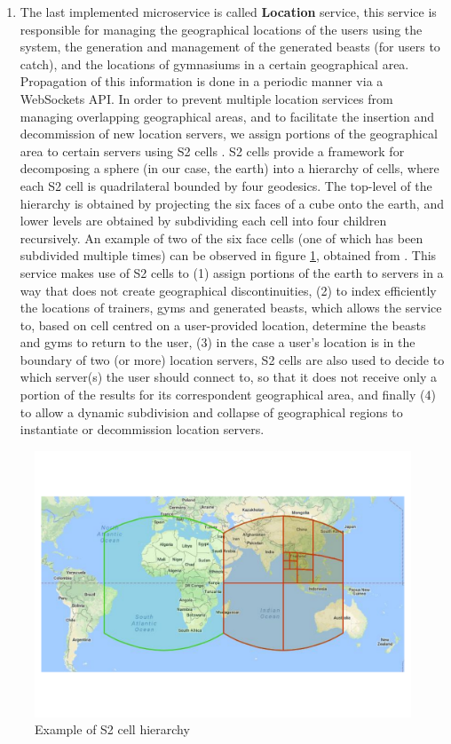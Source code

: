 \begin{enumerate}
    \item The last implemented microservice is called \textbf{Location} service, this service is responsible for managing the geographical locations of the users using the system, the generation and management of the generated beasts (for users to catch), and the locations of gymnasiums in a certain geographical area. Propagation of this information is done in a periodic manner via a WebSockets API. In order to prevent multiple location services from managing overlapping geographical areas, and to facilitate the insertion and decommission of new location servers, we assign portions of the geographical area to certain servers using S2 cells . S2 cells provide a framework for decomposing a sphere (in our case, the earth) into a hierarchy of cells, where each S2 cell is quadrilateral bounded by four geodesics. The top-level of the hierarchy is obtained by projecting the six faces of a cube onto the earth, and lower levels are obtained by subdividing each cell into four children recursively. An example of two of the six face cells (one of which has been subdivided multiple times) can be observed in figure \ref{fig:pouchbeasts-s2cells}, obtained from . This service makes use of S2 cells to (1) assign portions of the earth to servers in a way that does not create geographical discontinuities, (2) to index efficiently the locations of trainers, gyms and generated beasts, which allows the service to, based on cell centred on a user-provided location, determine the beasts and gyms to return to the user, (3) in the case a user's location is in the boundary of two (or more) location servers, S2 cells are also used to decide to which server(s) the user should connect to, so that it does not receive only a portion of the results for its correspondent geographical area, and finally (4) to allow a dynamic subdivision and collapse of geographical regions to instantiate or decommission location servers.
\end{enumerate}

\begin{figure}[htbp]
    \centering
    \includegraphics[width=\textwidth]{Chapters/benchmark/figures/s2_cells.pdf}
    \caption{Example of S2 cell hierarchy}
    \label{fig:pouchbeasts-s2cells}
\end{figure}


